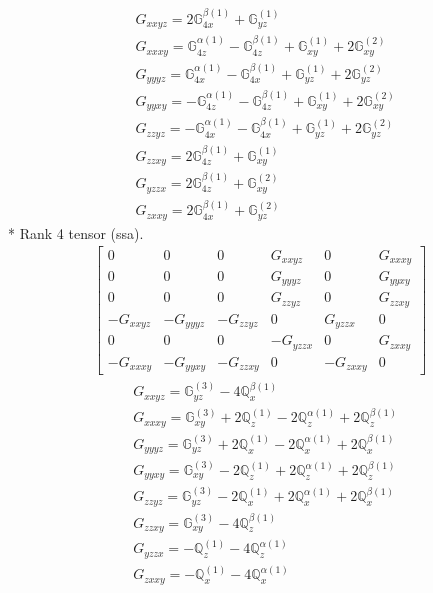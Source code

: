 \documentclass[fleqn,8pt,landscape]{jsarticle}
\begin{document}
\begin{align*}
& G_{xxyz} = 2 \mathbb{G}_{4x}^{\beta(1)} + \mathbb{G}_{yz}^{(1)} \\
& G_{xxxy} = \mathbb{G}_{4z}^{\alpha(1)} - \mathbb{G}_{4z}^{\beta(1)} + \mathbb{G}_{xy}^{(1)} + 2 \mathbb{G}_{xy}^{(2)} \\
& G_{yyyz} = \mathbb{G}_{4x}^{\alpha(1)} - \mathbb{G}_{4x}^{\beta(1)} + \mathbb{G}_{yz}^{(1)} + 2 \mathbb{G}_{yz}^{(2)} \\
& G_{yyxy} = - \mathbb{G}_{4z}^{\alpha(1)} - \mathbb{G}_{4z}^{\beta(1)} + \mathbb{G}_{xy}^{(1)} + 2 \mathbb{G}_{xy}^{(2)} \\
& G_{zzyz} = - \mathbb{G}_{4x}^{\alpha(1)} - \mathbb{G}_{4x}^{\beta(1)} + \mathbb{G}_{yz}^{(1)} + 2 \mathbb{G}_{yz}^{(2)} \\
& G_{zzxy} = 2 \mathbb{G}_{4z}^{\beta(1)} + \mathbb{G}_{xy}^{(1)} \\
& G_{yzzx} = 2 \mathbb{G}_{4z}^{\beta(1)} + \mathbb{G}_{xy}^{(2)} \\
& G_{zxxy} = 2 \mathbb{G}_{4x}^{\beta(1)} + \mathbb{G}_{yz}^{(2)}
\end{align*}
* Rank 4 tensor (ssa).
\begin{align*}
\begin{bmatrix} 0 & 0 & 0 & G_{xxyz} & 0 & G_{xxxy} \\ 0 & 0 & 0 & G_{yyyz} & 0 & G_{yyxy} \\ 0 & 0 & 0 & G_{zzyz} & 0 & G_{zzxy} \\ - G_{xxyz} & - G_{yyyz} & - G_{zzyz} & 0 & G_{yzzx} & 0 \\ 0 & 0 & 0 & - G_{yzzx} & 0 & G_{zxxy} \\ - G_{xxxy} & - G_{yyxy} & - G_{zzxy} & 0 & - G_{zxxy} & 0 \end{bmatrix}
\end{align*}
\begin{align*}
& G_{xxyz} = \mathbb{G}_{yz}^{(3)} - 4 \mathbb{Q}_{x}^{\beta(1)} \\
& G_{xxxy} = \mathbb{G}_{xy}^{(3)} + 2 \mathbb{Q}_{z}^{(1)} - 2 \mathbb{Q}_{z}^{\alpha(1)} + 2 \mathbb{Q}_{z}^{\beta(1)} \\
& G_{yyyz} = \mathbb{G}_{yz}^{(3)} + 2 \mathbb{Q}_{x}^{(1)} - 2 \mathbb{Q}_{x}^{\alpha(1)} + 2 \mathbb{Q}_{x}^{\beta(1)} \\
& G_{yyxy} = \mathbb{G}_{xy}^{(3)} - 2 \mathbb{Q}_{z}^{(1)} + 2 \mathbb{Q}_{z}^{\alpha(1)} + 2 \mathbb{Q}_{z}^{\beta(1)} \\
& G_{zzyz} = \mathbb{G}_{yz}^{(3)} - 2 \mathbb{Q}_{x}^{(1)} + 2 \mathbb{Q}_{x}^{\alpha(1)} + 2 \mathbb{Q}_{x}^{\beta(1)} \\
& G_{zzxy} = \mathbb{G}_{xy}^{(3)} - 4 \mathbb{Q}_{z}^{\beta(1)} \\
& G_{yzzx} = - \mathbb{Q}_{z}^{(1)} - 4 \mathbb{Q}_{z}^{\alpha(1)} \\
& G_{zxxy} = - \mathbb{Q}_{x}^{(1)} - 4 \mathbb{Q}_{x}^{\alpha(1)}
\end{align*}
\end{document}
